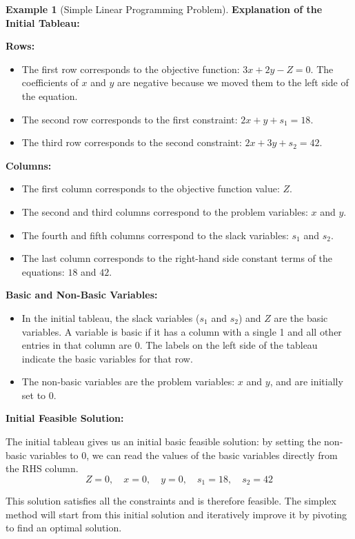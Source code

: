 \documentclass[11pt,a4paper]{article}
\theoremstyle{definition}
\newtheorem{example}{Example}[section]
\theoremstyle{plain}
\theoremstyle{remark}
\begin{document}
\begin{example}[Simple Linear Programming Problem]
    \textbf{Explanation of the Initial Tableau:}
    
    \textbf{Rows:}
    \begin{itemize}
        \item The first row corresponds to the objective function: $3x + 2y - Z = 0$. The coefficients of $x$ and $y$ are negative because we moved them to the left side of the equation.
        \item The second row corresponds to the first constraint: $2x + y + s_1 = 18$.
        \item The third row corresponds to the second constraint: $2x + 3y + s_2 = 42$.
    \end{itemize}
    
    \textbf{Columns:}
    \begin{itemize}
        \item The first column corresponds to the objective function value: $Z$.
        \item The second and third columns correspond to the problem variables: $x$ and $y$.
        \item The fourth and fifth columns correspond to the slack variables: $s_1$ and $s_2$.
        \item The last column corresponds to the right-hand side constant terms of the equations: $18$ and $42$.
    \end{itemize}
    
    \textbf{Basic and Non-Basic Variables:}
    \begin{itemize}
        \item In the initial tableau, the slack variables ($s_1$ and $s_2$) and $Z$ are the basic variables. A variable is basic if it has a column with a single 1 and all other entries in that column are 0. The labels on the left side of the tableau indicate the basic variables for that row.
        \item The non-basic variables are the problem variables: $x$ and $y$, and are initially set to 0.
    \end{itemize}
    
    \textbf{Initial Feasible Solution:}
    
    The initial tableau gives us an initial basic feasible solution: by setting the non-basic variables to 0, we can read the values of the basic variables directly from the RHS column.
    \[
        Z = 0, \quad x = 0, \quad y = 0, \quad s_1 = 18, \quad s_2 = 42
    \]
    
    This solution satisfies all the constraints and is therefore feasible. The simplex method will start from this initial solution and iteratively improve it by pivoting to find an optimal solution.
\end{example}
\end{document}
